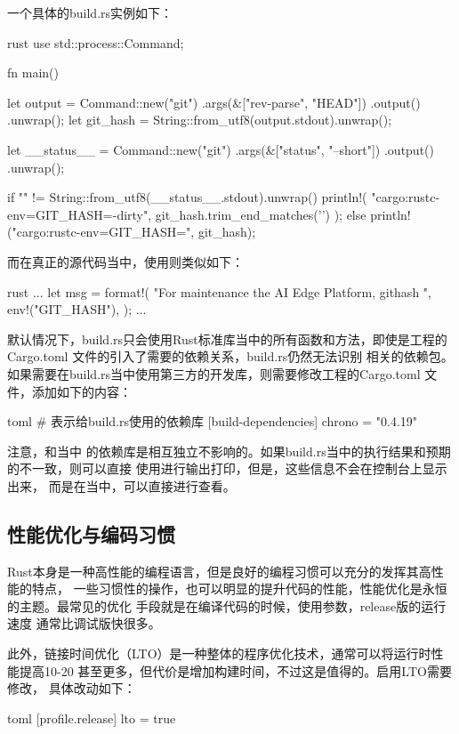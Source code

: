 一个具体的build.rs实例如下：
\begin{code-block}{rust}
use std::process::Command;

fn main() {
    let output = Command::new("git")
        .args(&["rev-parse", "HEAD"])
        .output()
        .unwrap();
    let git_hash = String::from_utf8(output.stdout).unwrap();

    let __status__ = Command::new("git")
        .args(&["status", "--short"])
        .output()
        .unwrap();

    if "" != String::from_utf8(__status__.stdout).unwrap() {
        println!(
            "cargo:rustc-env=GIT_HASH={}-dirty",
            git_hash.trim_end_matches('\n')
        );
    } else {
        println!("cargo:rustc-env=GIT_HASH={}", git_hash);
    }
}
\end{code-block}

而在真正的源代码当中，使用则类似如下：
\begin{code-block}{rust}
...
let msg = format!(
    "For maintenance the AI Edge Platform, \nbuilt githash {}",
    env!("GIT_HASH"),
);
...
\end{code-block}

默认情况下，build.rs只会使用Rust标准库当中的所有函数和方法，即使是工程的Cargo.toml
文件的引入了需要的依赖关系，build.rs仍然无法识别
相关的依赖包。如果需要在build.rs当中使用第三方的开发库，则需要修改工程的Cargo.toml
文件，添加如下的内容：
\begin{code-block}{toml}
# 表示给build.rs使用的依赖库
[build-dependencies]
chrono = "0.4.19"
\end{code-block}

注意，和当中
的依赖库是相互独立不影响的。如果build.rs当中的执行结果和预期的不一致，则可以直接
使用进行输出打印，但是，这些信息不会在控制台上显示出来，
而是在当中，可以直接进行查看。

\subsection{性能优化与编码习惯}
Rust本身是一种高性能的编程语言，但是良好的编程习惯可以充分的发挥其高性能的特点，
一些习惯性的操作，也可以明显的提升代码的性能，性能优化是永恒的主题。最常见的优化
手段就是在编译代码的时候，使用参数，release版的运行速度
通常比调试版快很多。

此外，链接时间优化（LTO）是一种整体的程序优化技术，通常可以将运行时性能提高10-20%
甚至更多，但代价是增加构建时间，不过这是值得的。启用LTO需要修改，
具体改动如下：
\begin{code-block}{toml}
[profile.release]
lto = true
\end{code-block}

